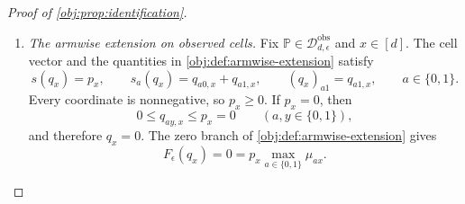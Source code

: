 \documentclass[11pt]{article}
\begin{document}
\begin{proof}[Proof of \cref{obj:prop:identification}]
\begin{enumerate}
Suppose now that \(p_x>0\). The lower overlap bound in \cref{obj:ass:shrinking-overlap} gives
\[
q_{10,x}+q_{11,x}=p_x\pi_x\ge\epsilon p_x>0.
\]
The decomposition of the cell mass and the upper overlap bound give
\[
\begin{aligned}
p_x&=(q_{00,x}+q_{01,x})+(q_{10,x}+q_{11,x}),\\
q_{10,x}+q_{11,x}&\le(1-\epsilon)p_x,
\end{aligned}
\]
and hence
\[
q_{00,x}+q_{01,x}
=p_x-(q_{10,x}+q_{11,x})
\ge\epsilon p_x>0.
\]
Thus both arm masses are positive.

For either \(a\in\{0,1\}\), \cref{obj:ass:conditional-exchangeability} supplies
\[
P(X=x,A=a,Y(a)=1)\,p_x
=
P(X=x,A=a)\,P(X=x,Y(a)=1).
\]
Consistency, as specified in \cref{obj:ass:consistency}, identifies the selected atoms:
\[
P(X=x,A=a,Y(a)=y)=q_{ay,x},
\qquad y\in\{0,1\}.
\]
Summing this identity over \(y\), and substituting its outcome-one instance into the exchangeability identity, gives
\[
P(X=x,A=a)=q_{a0,x}+q_{a1,x},
\qquad
q_{a1,x}p_x
=(q_{a0,x}+q_{a1,x})P(X=x,Y(a)=1).
\]
Division by the positive cell and arm masses now yields
\[
\mathbb E_P[Y(a)\mid X=x]
=
\frac{P(X=x,Y(a)=1)}{p_x}
=
\frac{q_{a1,x}}{q_{a0,x}+q_{a1,x}}
=\mu_{ax}.
\]
Combining the positive- and zero-mass cases and summing over \(x\) proves
\[
\begin{aligned}
V^\star(P)
&=\sum_{x\in[d]}P(X=x)
\max_{a\in\{0,1\}}\mathbb E_P[Y(a)\mid X=x]\\
&=\sum_{x\in[d]}p_x\max_{a\in\{0,1\}}\mu_{ax}
=\Psi\{\operatorname{Obs}(P)\},
\end{aligned}
\]
where the last equality is the definition in \cref{obj:def:observed-value}.

\item \emph{The armwise extension on observed cells.}
Fix \(\mathbb P\in\mathcal D_{d,\epsilon}^{\mathrm{obs}}\) and \(x\in[d]\). The cell vector and the quantities in \cref{obj:def:armwise-extension} satisfy
\[
s(q_x)=p_x,\qquad
s_a(q_x)=q_{a0,x}+q_{a1,x},\qquad
(q_x)_{a1}=q_{a1,x},
\qquad a\in\{0,1\}.
\]
Every coordinate is nonnegative, so \(p_x\ge0\). If \(p_x=0\), then
\[
0\le q_{ay,x}\le p_x=0
\qquad(a,y\in\{0,1\}),
\]
and therefore \(q_x=0\). The zero branch of \cref{obj:def:armwise-extension} gives
\[
F_\epsilon(q_x)=0
=p_x\max_{a\in\{0,1\}}\mu_{ax}.
\]


\end{enumerate}
\end{proof}
\end{document}
